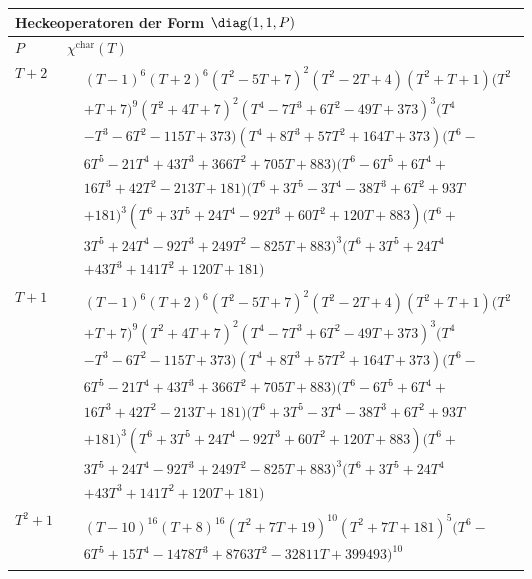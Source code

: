 \begin{tabular}{| l | l |}
\multicolumn{2}{l}{\bf Heckeoperatoren der Form $\diag(1,1,P)$} \\
\hline
$P$ & $\chi^\text{char}(T)$ \\
\hline
$T + 2$ &
$\!\begin{aligned}
	&(T - 1)^{6}(T + 2)^{6}(T^{2} - 5T + 7)^{2}(T^{2} - 2T + 4)(T^{2} + T + 1)(T^{2} \\&
+ T + 7)^{9}(T^{2} + 4T + 7)^{2}(T^{4} - 7T^{3} + 6T^{2} - 49T + 373)^{3}(T^{4} \\&
- T^{3} - 6T^{2} - 115T + 373)(T^{4} + 8T^{3} + 57T^{2} + 164T + 373)(T^{6} - \\&
6T^{5} - 21T^{4} + 43T^{3} + 366T^{2} + 705T + 883)(T^{6} - 6T^{5} + 6T^{4} + \\&
16T^{3} + 42T^{2} - 213T + 181)(T^{6} + 3T^{5} - 3T^{4} - 38T^{3} + 6T^{2} + 93T\\&
+ 181)^{3}(T^{6} + 3T^{5} + 24T^{4} - 92T^{3} + 60T^{2} + 120T + 883)(T^{6} + \\&
3T^{5} + 24T^{4} - 92T^{3} + 249T^{2} - 825T + 883)^{3}(T^{6} + 3T^{5} + 24T^{4}\\&
+ 43T^{3} + 141T^{2} + 120T + 181)\end{aligned}$ \\
\hline
$T + 1$ &
$\!\begin{aligned}
	&(T - 1)^{6}(T + 2)^{6}(T^{2} - 5T + 7)^{2}(T^{2} - 2T + 4)(T^{2} + T + 1)(T^{2} \\&
+ T + 7)^{9}(T^{2} + 4T + 7)^{2}(T^{4} - 7T^{3} + 6T^{2} - 49T + 373)^{3}(T^{4} \\&
- T^{3} - 6T^{2} - 115T + 373)(T^{4} + 8T^{3} + 57T^{2} + 164T + 373)(T^{6} - \\&
6T^{5} - 21T^{4} + 43T^{3} + 366T^{2} + 705T + 883)(T^{6} - 6T^{5} + 6T^{4} + \\&
16T^{3} + 42T^{2} - 213T + 181)(T^{6} + 3T^{5} - 3T^{4} - 38T^{3} + 6T^{2} + 93T\\&
+ 181)^{3}(T^{6} + 3T^{5} + 24T^{4} - 92T^{3} + 60T^{2} + 120T + 883)(T^{6} + \\&
3T^{5} + 24T^{4} - 92T^{3} + 249T^{2} - 825T + 883)^{3}(T^{6} + 3T^{5} + 24T^{4}\\&
+ 43T^{3} + 141T^{2} + 120T + 181)\end{aligned}$ \\
\hline
$T^2 + 1$ &
$\!\begin{aligned}
	&(T - 10)^{16}(T + 8)^{16}(T^{2} + 7T + 19)^{10}(T^{2} + 7T + 181)^{5}(T^{6} - \\&
6T^{5} + 15T^{4} - 1478T^{3} + 8763T^{2} - 32811T + 399493)^{10}\end{aligned}$ \\

\end{tabular}
